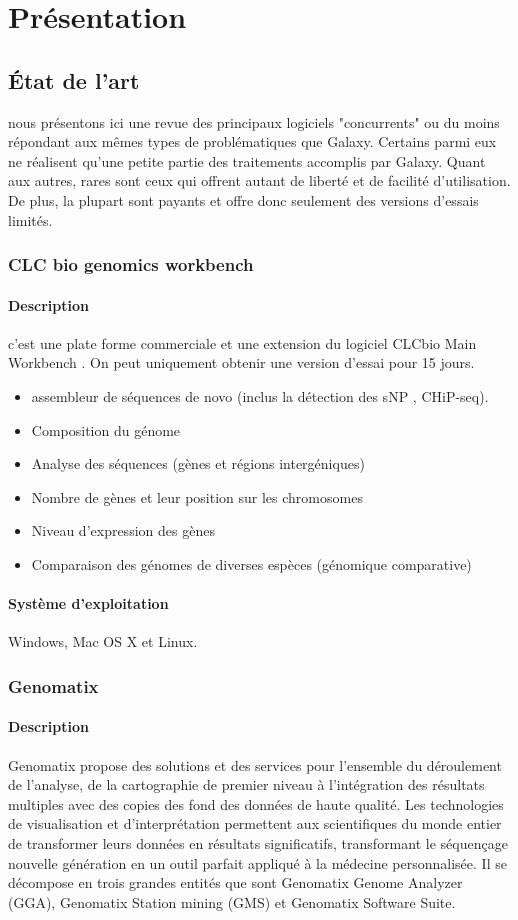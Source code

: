 \chapter{Présentation}

\section{État de l'art}

nous présentons ici une revue des principaux logiciels "concurrents" ou du moins répondant aux mêmes types de problématiques que Galaxy. Certains parmi eux ne réalisent qu'une petite partie des traitements accomplis par Galaxy. Quant aux autres, rares sont ceux qui offrent autant de liberté et de facilité d'utilisation. De plus, la plupart sont payants et offre donc seulement des versions d'essais limités.

\subsection{CLC bio genomics workbench }
\subsubsection{Description}
c'est une plate forme commerciale et une extension du logiciel CLCbio Main Workbench .
On peut uniquement obtenir une version d'essai pour 15 jours.
\begin{itemize}
\item{assembleur de séquences de novo (inclus la détection des sNP , CHiP-seq).}
\item{Composition du génome }
\item{Analyse des séquences (gènes et régions intergéniques)}
\item{Nombre de gènes et leur position sur les chromosomes }
\item{Niveau d’expression des gènes }
\item{Comparaison des génomes de diverses espèces (génomique comparative)}
\end{itemize}
\subsubsection{Système d'exploitation}
 Windows, Mac OS X et Linux.
\subsection{Genomatix}
\subsubsection{Description}
Genomatix propose des solutions et des services pour l'ensemble du déroulement de l'analyse, de la cartographie de premier niveau à l'intégration des résultats multiples avec des copies des fond des données de haute qualité. Les technologies de visualisation et d'interprétation permettent aux scientifiques du monde entier de transformer leurs données en résultats significatifs, transformant le séquençage nouvelle génération en un outil parfait appliqué à la médecine personnalisée. Il se décompose en trois grandes entités que sont Genomatix Genome Analyzer (GGA), Genomatix Station  mining (GMS) et Genomatix Software Suite.
